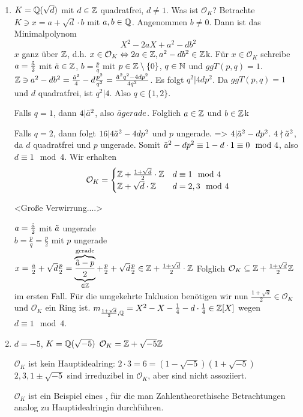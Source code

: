 \documentclass[../main.tex]{subfiles}
\begin{document}
\begin{example*}
    \begin{enumerate}[label=(\arabic*)]
        \item $K=\mathbb{Q}(\sqrt{d})$ mit $d\in \mathbb{Z}$ quadratfrei, $d\neq 1$.
        Was ist $\mathcal{O}_K$? Betrachte $K\ni x = a+\sqrt{d}\cdot b$ mit $a,b\in \mathbb{Q}$.
        Angenommen $b\neq 0$. Dann ist das Minimalpolynom $$X^2-2aX+a^2-db^2$$
        $x$ ganz über $\mathbb{Z}$, d.h. $x\in \mathcal{O}_K\Leftrightarrow 2a\in \mathbb{Z}, a^2-db^2\in \mathbb{Z}$k.
        Für $x\in \mathcal{O}_K$ schreibe $a=\frac{\Tilde{a}}{2}$ mit $\Tilde{a}\in \mathbb{Z}$, $b=\frac{p}{q}$ mit $p\in \mathbb{Z}\setminus\{0\}$, $q\in \mathbb{N}$ und $ggT(p,q)=1$.
        $\mathbb{Z}\ni a^2 - db^2 = \frac{\Tilde{a}^2}{4}-d\frac{p^2}{q^2} = \frac{\Tilde{a}^2q^2-4dp^2}{4q^2}$.
        Es folgt $q^2|4dp^2$. Da $ggT(p,q)=1$ und $d$ quadratfrei, ist $q^2|4$. Also $q\in \{1,2\}$.

        Falls $q=1$, dann $4|\Tilde{a}^2$, also $\Tilde{a} gerade$.
        Folglich $a\in \mathbb{Z}$ und $b\in \mathbb{Z}$k

        Falls $q=2$, dann folgt $16| 4\Tilde{a}^2-4dp^2$ und $p$ ungerade. => $4|\Tilde{a}^2-dp^2$. $4\nmid \Tilde{a}^2$, da $d$ quadratfrei und $p$ ungerade.
        Somit $\Tilde{a}^2-dp^2 \equiv 1-d\cdot 1 \equiv 0\mod 4$, also $d\equiv 1 \mod 4$.
        Wir erhalten
        $$\mathcal{O}_K = \begin{cases}
            \mathbb{Z}+ \frac{1+\sqrt{d}}{2}\cdot \mathbb{Z} & d\equiv 1 \mod 4\\
            \mathbb{Z} + \sqrt{d} \cdot \mathbb{Z} & d= 2,3 \mod 4
        \end{cases}$$
        
        <Große Verwirrung....>
        
        $a=\frac{\Tilde{a}}{2}$ mit $\Tilde{a}$ ungerade\\
        $b=\frac{p}{q} = \frac{p}{2}$ mit $p$ ungerade\\
        $x=\frac{\Tilde{a}}{2}+\sqrt{d}\frac{p}{2} =\overbrace{\underbrace{\frac{\Tilde{a}-p}{2}}_{\in\mathbb{Z}}}^{\text{gerade}} + \frac{p}{2}+\sqrt{d}\frac{p}{2}\in \mathbb{Z} + \frac{1+\sqrt{d}}{2}\cdot \mathbb{Z}$
        Folglich $\mathcal{O}_K\subseteq \mathbb{Z} + \frac{1+\sqrt{d}}{2}\mathbb{Z}$ im ersten Fall.
        Für die umgekehrte Inklusion benötigen wir nun $\frac{1+\sqrt{d}}{2}\in \mathcal{O}_K$ und $\mathcal{O}_K$ ein Ring ist.
        $m_{\frac{1+\sqrt{d}}{2},\mathbb{Q}} = X^2 - X - \frac{1}{4}-d\cdot \frac{1}{4}\in \mathbb{Z}[X]$ wegen $d\equiv 1 \mod 4$.
        \item $d=-5$, $K=\mathbb{Q}(\sqrt{-5})$
        $\mathcal{O}_K = \mathbb{Z} + \sqrt{-5}\mathbb{Z}$

        $\mathcal{O}_K$ ist kein Hauptidealring:
        $2\cdot 3 = 6 = (1-\sqrt{-5})(1+\sqrt{-5})$
        $2,3,1\pm\sqrt{-5}$ sind irreduzibel in $\mathcal{O}_K$, aber sind nicht assoziiert.

        $\mathcal{O}_K$ ist ein Beispiel eines , für die man Zahlentheorethische Betrachtungen analog zu Hauptidealringin durchführen.
    \end{enumerate}
\end{example*}
\end{document}
